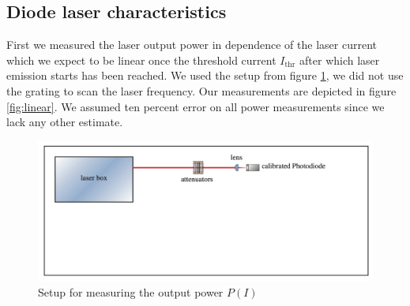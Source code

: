 \documentclass[11pt,a4paper,notitlepage]{scrartcl}
\begin{document}
\subsection{Diode laser characteristics}
First we measured the laser output power in dependence of the laser current which we expect to be linear once the threshold current $I_\text{thr}$ after which laser emission starts has been reached. We used the setup from figure \ref{fig:linearexp}, we did not use the grating to scan the laser frequency. Our measurements are depicted in figure \ref{fig:linear}. We assumed ten percent error on all power measurements since we lack any other estimate.
\begin{figure}[htbp]
	\centering
	\includegraphics[width=.7\linewidth]{figs/experimental_setup/setup1.png}
	\caption{Setup for measuring the output power $P(I)$\cite{manual}}
	\label{fig:linearexp}
\end{figure}
\end{document}
